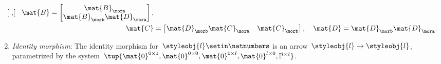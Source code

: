 \begin{ctdefinition}
\begin{enumerate}
\begin{equation}
\begin{aligned}
\begin{bmatrix}
                              \end{bmatrix},\quad
                      \mat{B}=\begin{bmatrix}
                                  \mat{B}_\mora \\
                                  \mat{B}_\morb\mat{D}_\mora
                              \end{bmatrix}, \\
                      \mat{C}    & =\begin{bmatrix}
                                        \mat{D}_\morb\mat{C}_\mora & \mat{C}_\morb
                                    \end{bmatrix}, \quad
                      \mat{D}=\mat{D}_\morb\mat{D}_\mora.
                  \end{aligned}
              \end{equation}
        \item \emph{Identity morphism}: The identity morphism for~$\styleobj{l}\setin \natnumbers$ is an arrow~$\styleobj{l}\to \styleobj{l}$, parametrized by the system~$\tup{\mat{0}^{0\times 1},\mat{0}^{0\times 0},\mat{0}^{0\times l},\mat{0}^{l\times 0},\mathbb{I}^{l\times l}}$.

    \end{enumerate}
\end{ctdefinition}


